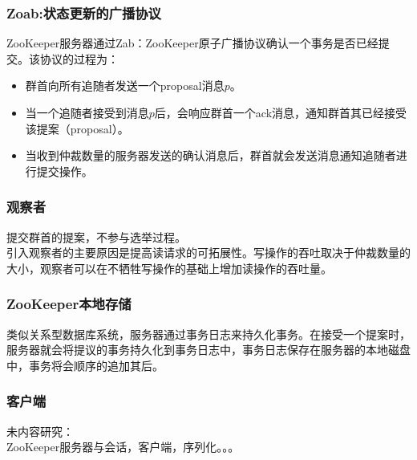 \documentclass{beamer}
\begin{document}
\begin{frame}
	\frametitle{Zoab:状态更新的广播协议}
	ZooKeeper服务器通过Zab：ZooKeeper原子广播协议确认一个事务是否已经提交。该协议的过程为：
\begin{itemize}
	\item<1-> 群首向所有追随者发送一个proposal消息\( p \)。
	\item<2-> 当一个追随者接受到消息\( p \)后，会响应群首一个ack消息，通知群首其已经接受该提案（proposal）。
	\item<3-> 当收到仲裁数量的服务器发送的确认消息后，群首就会发送消息通知追随者进行提交操作。
\end{itemize}
\end{frame}

\begin{frame}
	\frametitle{观察者}
	提交群首的提案，不参与选举过程。
	\\
	引入观察者的主要原因是提高读请求的可拓展性。写操作的吞吐取决于仲裁数量的大小，观察者可以在不牺牲写操作的基础上增加读操作的吞吐量。
\end{frame}

\begin{frame}
	\frametitle{ZooKeeper本地存储}
	类似关系型数据库系统，服务器通过事务日志来持久化事务。在接受一个提案时，服务器就会将提议的事务持久化到事务日志中，事务日志保存在服务器的本地磁盘中，事务将会顺序的追加其后。
\end{frame}

\begin{frame}
	\frametitle{客户端}
	未内容研究：
	\\
	ZooKeeper服务器与会话，客户端，序列化。。。
\end{frame}
\end{document}

